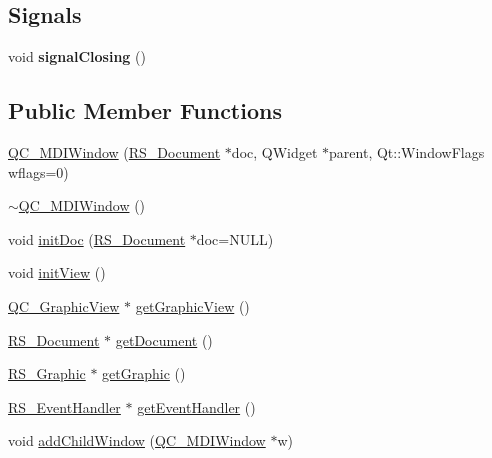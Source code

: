 \subsection*{Signals}
\begin{DoxyCompactItemize}
\item 
\hypertarget{classQC__MDIWindow_a94ea74358aab224adbbfc0fa588d5dd3}{void {\bfseries signal\-Closing} ()}\label{classQC__MDIWindow_a94ea74358aab224adbbfc0fa588d5dd3}

\end{DoxyCompactItemize}
\subsection*{Public Member Functions}
\begin{DoxyCompactItemize}
\item 
\hyperlink{classQC__MDIWindow_af87ec3c807d776644b484708f188e8a6}{Q\-C\-\_\-\-M\-D\-I\-Window} (\hyperlink{classRS__Document}{R\-S\-\_\-\-Document} $\ast$doc, Q\-Widget $\ast$parent, Qt\-::\-Window\-Flags wflags=0)
\item 
\hyperlink{classQC__MDIWindow_adb751d37eea090036dac54b2e3396fb6}{$\sim$\-Q\-C\-\_\-\-M\-D\-I\-Window} ()
\item 
void \hyperlink{classQC__MDIWindow_a3099f9159be08a24998f4fe2ed745ea6}{init\-Doc} (\hyperlink{classRS__Document}{R\-S\-\_\-\-Document} $\ast$doc=N\-U\-L\-L)
\item 
void \hyperlink{classQC__MDIWindow_ae34ffe4aa76932d2c5fd87e913975b41}{init\-View} ()
\item 
\hyperlink{classQC__GraphicView}{Q\-C\-\_\-\-Graphic\-View} $\ast$ \hyperlink{classQC__MDIWindow_ab4d194d114f9dc69a7302e2722909f71}{get\-Graphic\-View} ()
\item 
\hyperlink{classRS__Document}{R\-S\-\_\-\-Document} $\ast$ \hyperlink{classQC__MDIWindow_ae03f04b19c6c1f8c87c724b4f542f244}{get\-Document} ()
\item 
\hyperlink{classRS__Graphic}{R\-S\-\_\-\-Graphic} $\ast$ \hyperlink{classQC__MDIWindow_a93b0102a08df9aadf8913b36d818c5b7}{get\-Graphic} ()
\item 
\hyperlink{classRS__EventHandler}{R\-S\-\_\-\-Event\-Handler} $\ast$ \hyperlink{classQC__MDIWindow_a9da08d467cbdcefe6808e4850e9afa94}{get\-Event\-Handler} ()
\item 
void \hyperlink{classQC__MDIWindow_a3324dcc1350dd4cd7797945cd365f2f5}{add\-Child\-Window} (\hyperlink{classQC__MDIWindow}{Q\-C\-\_\-\-M\-D\-I\-Window} $\ast$w)
\item 

\end{DoxyCompactItemize}
